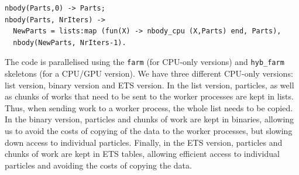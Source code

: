 \documentclass[final]{jfp1}
\makeatletter
\def\thickhrulefill{\leavevmode \leaders \hrule height 0.5pt \hfill \kern \z@}
\newcommand{\hrules}{\vspace{1.5ex}\thickhrulefill}
\newcommand{\hrulee}{\thickhrulefill\vspace{1.5ex}}
\makeatother
\begin{document}
\begin{lstlisting}
nbody(Parts,0) -> Parts;
nbody(Parts, NrIters) ->
  NewParts = lists:map (fun(X) -> nbody_cpu (X,Parts) end, Parts),
  nbody(NewParts, NrIters-1).
\end{lstlisting}




\noindent
The code is parallelised using the \lstinline{farm} (for CPU-only versions)
and \lstinline{hyb_farm} skeletons (for a CPU/GPU version). We have three
different CPU-only versions: list version, binary version and ETS version.
In the list version, particles, as well as chunks of works that
need to be sent to the worker processes are kept in lists. Thus, when sending
work to a worker process, the whole list needs to be copied.  In the
binary version, particles and chunks of work are kept in binaries, allowing us
to avoid the costs of copying of the data to the worker processes, but slowing
down access to individual particles. Finally, in the ETS version, particles and
chunks of work are kept in ETS tables, allowing efficient access to individual
particles and avoiding the costs of copying the data.





\end{document}
